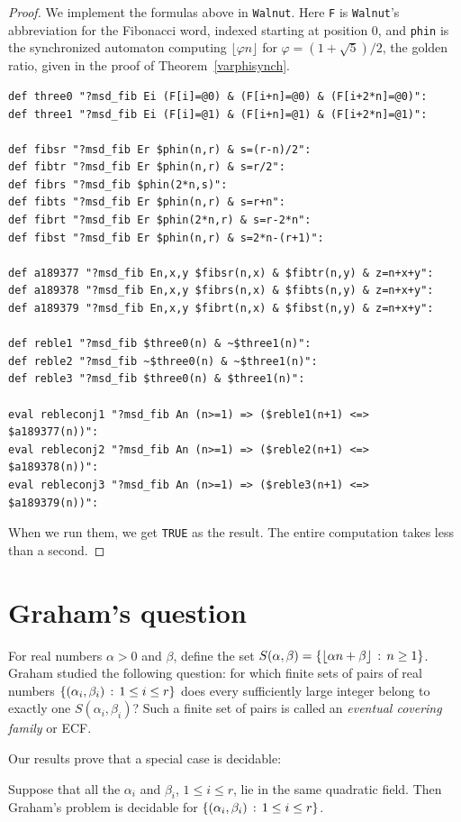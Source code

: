 \documentclass[12pt,reqno]{article}
\begin{document}
\begin{proof}
We implement the formulas above in \texttt{Walnut}.   Here {\tt F} is {\tt Walnut}'s abbreviation for the Fibonacci word, indexed starting at position $0$,
and {\tt phin} is the synchronized automaton computing
$\lfloor \varphi n \rfloor$ for $\varphi = (1+\sqrt{5})/2$, the golden ratio,
given in the proof of Theorem~\ref{varphisynch}.
\begin{verbatim}
def three0 "?msd_fib Ei (F[i]=@0) & (F[i+n]=@0) & (F[i+2*n]=@0)":
def three1 "?msd_fib Ei (F[i]=@1) & (F[i+n]=@1) & (F[i+2*n]=@1)":

def fibsr "?msd_fib Er $phin(n,r) & s=(r-n)/2":
def fibtr "?msd_fib Er $phin(n,r) & s=r/2":
def fibrs "?msd_fib $phin(2*n,s)":
def fibts "?msd_fib Er $phin(n,r) & s=r+n":
def fibrt "?msd_fib Er $phin(2*n,r) & s=r-2*n":
def fibst "?msd_fib Er $phin(n,r) & s=2*n-(r+1)":

def a189377 "?msd_fib En,x,y $fibsr(n,x) & $fibtr(n,y) & z=n+x+y":
def a189378 "?msd_fib En,x,y $fibrs(n,x) & $fibts(n,y) & z=n+x+y":
def a189379 "?msd_fib En,x,y $fibrt(n,x) & $fibst(n,y) & z=n+x+y":

def reble1 "?msd_fib $three0(n) & ~$three1(n)":
def reble2 "?msd_fib ~$three0(n) & ~$three1(n)":
def reble3 "?msd_fib $three0(n) & $three1(n)":

eval rebleconj1 "?msd_fib An (n>=1) => ($reble1(n+1) <=> $a189377(n))":
eval rebleconj2 "?msd_fib An (n>=1) => ($reble2(n+1) <=> $a189378(n))":
eval rebleconj3 "?msd_fib An (n>=1) => ($reble3(n+1) <=> $a189379(n))":
\end{verbatim}
When we run them, we get 
\texttt{TRUE}
as the result.   The entire computation takes less than a second.
\end{proof}


\section{Graham's question}
\label{graham}

For real numbers $\alpha > 0$ and $\beta$, define the set
$S(\alpha, \beta) = \{ \lfloor \alpha n + \beta \rfloor 
\, : \, n \geq 1 \}$.
Graham \cite{Graham:1973} studied the following question:
for which finite sets of pairs of real numbers
$\{ (\alpha_i, \beta_i) \, : \, 1 \leq i \leq r \}$
does every sufficiently large integer belong to exactly
one $S(\alpha_i, \beta_i)$?  Such a finite set of pairs is called
an {\it eventual covering family\/} or ECF.

Our results prove that a special case is decidable:
\begin{theorem}
Suppose that all the $\alpha_i$ and $\beta_i$, $1 \leq i \leq r$,
lie in the
same quadratic field.  Then Graham's problem is decidable
for $\{ (\alpha_i, \beta_i) \, : \, 1 \leq i \leq r \}$.
\end{theorem}
\end{document}

